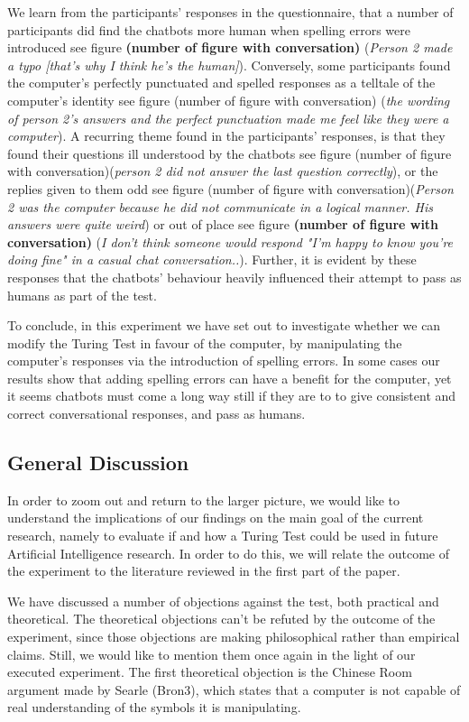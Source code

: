 We learn from the participants' responses in the questionnaire, that a number of participants did find the chatbots more human when spelling errors were introduced see figure \textbf{(number of figure with conversation)} (\textit{Person 2 made a typo [that's why I think he's the human]}). Conversely, some participants found the computer's perfectly punctuated and spelled responses as a telltale of the computer's identity see figure (number of figure with conversation) (\textit{the wording of person 2's answers and the perfect punctuation made me feel like they were a computer}). A recurring theme found in the participants' responses, is that they found their questions ill understood by the chatbots see figure (number of figure with conversation)(\textit{person 2 did not answer the last question correctly}), or the replies given to them odd see figure (number of figure with conversation)(\textit{Person 2 was the computer because he did not communicate in a logical manner. His answers were quite weird}) or out of place see figure \textbf{(number of figure with conversation)} (\textit{I don't think someone would respond "I'm happy to know you're doing fine" in a casual chat conversation..}). Further, it is evident by these responses that the chatbots' behaviour heavily influenced their attempt to pass as humans as part of the test.

To conclude, in this experiment we have set out to investigate whether we can modify the Turing Test in favour of the computer, by manipulating the computer's responses via the introduction of spelling errors. In some cases our results show that adding spelling errors can have a benefit for the computer, yet it seems chatbots must come a long way still if they are to to give consistent and correct conversational responses, and pass as humans.


\subsection{General Discussion}
In order to zoom out and return to the larger picture, we would like to understand the implications of our findings on the main goal of the current research, namely to evaluate if and how a Turing Test could be used in future Artificial Intelligence research. In order to do this, we will relate the outcome of the experiment to the literature reviewed in the first part of the paper.

We have discussed a number of objections against the test, both practical and theoretical. The theoretical objections can't be refuted by the outcome of the experiment, since those objections are making philosophical rather than empirical claims. Still, we would like to mention them once again in the light of our executed experiment. The first theoretical objection is the Chinese Room argument made by Searle (Bron3), which states that a computer is not capable of real understanding of the symbols it is manipulating.

